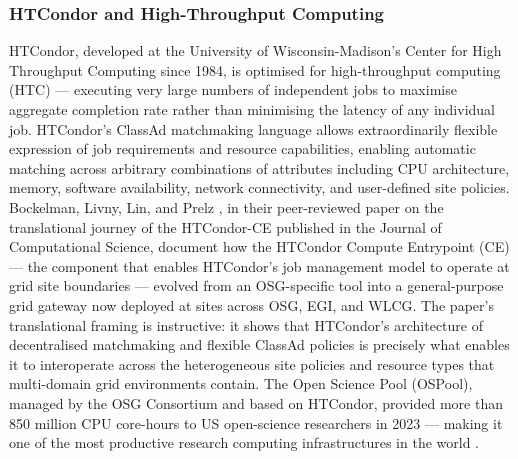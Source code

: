 \documentclass[12pt,a4paper]{report}
\begin{document}
    \subsubsection{HTCondor and High-Throughput Computing}
    HTCondor, developed at the University of Wisconsin-Madison’s Center for High Throughput Computing since 1984, is optimised for high-throughput 
    computing (HTC) — executing very large numbers of independent jobs to maximise aggregate completion rate rather than minimising the latency of 
    any individual job. HTCondor’s ClassAd matchmaking language allows extraordinarily flexible expression of job requirements and resource capabilities,
     enabling automatic matching across arbitrary combinations of attributes including CPU architecture, memory, software availability, network connectivity, 
     and user-defined site policies. Bockelman, Livny, Lin, and Prelz \parencite{bockelman2020htcondorce}, in their peer-reviewed paper on the translational journey of the 
     HTCondor-CE published in the Journal of Computational Science, document how the HTCondor Compute Entrypoint (CE) — the component that
      enables HTCondor’s job management model to operate at grid site boundaries — evolved from an OSG-specific tool into a general-purpose grid gateway 
      now deployed at sites across OSG, EGI, and WLCG. The paper’s translational framing is instructive: it shows that HTCondor’s architecture of 
      decentralised matchmaking and flexible ClassAd policies is precisely what enables it to interoperate across the heterogeneous site policies 
      and resource types that multi-domain grid environments contain. The Open Science Pool (OSPool), managed by the OSG Consortium and based on 
      HTCondor, provided more than 850 million CPU core-hours to US open-science researchers in 2023 — making it one of the most productive research computing infrastructures in the world  \parencite{graur2023}.
\end{document}
